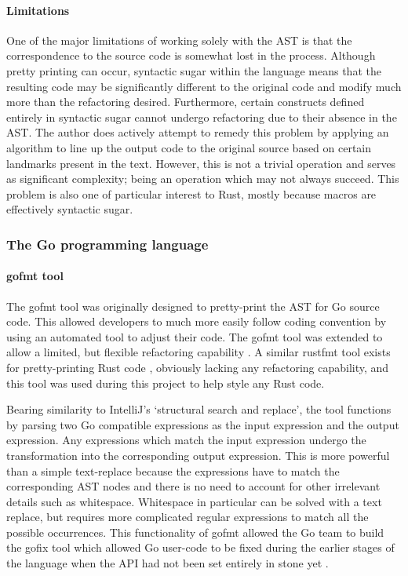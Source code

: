 \paragraph{Limitations}
One of the major limitations of working solely with the AST is that the correspondence to the source code is somewhat lost in the process. Although pretty printing can occur, syntactic sugar within the language means that the resulting code may be significantly different to the original code and modify much more than the refactoring desired. Furthermore, certain constructs defined entirely in syntactic sugar cannot undergo refactoring due to their absence in the AST. The author does actively attempt to remedy this problem by applying an algorithm to line up the output code to the original source based on certain landmarks present in the text. However, this is not a trivial operation and serves as significant complexity; being an operation which may not always succeed. This problem is also one of particular interest to Rust, mostly because macros are effectively syntactic sugar.

\subsubsection{The Go programming language}
\paragraph{gofmt tool}
The gofmt tool was originally designed to pretty-print the AST for Go source code. This allowed developers to much more easily follow coding convention by using an automated tool to adjust their code. The gofmt tool was extended to allow a limited, but flexible refactoring capability \cite{gofmt15}. A similar rustfmt tool exists for pretty-printing Rust code \cite{rfmt}, obviously lacking any refactoring capability, and this tool was used during this project to help style any Rust code.

Bearing similarity to IntelliJ's `structural search and replace', the tool functions by parsing two Go compatible expressions as the input expression and the output expression. Any expressions which match the input expression undergo the transformation into the corresponding output expression. This is more powerful than a simple text-replace because the expressions have to match the corresponding AST nodes and there is no need to account for other irrelevant details such as whitespace. Whitespace in particular can be solved with a text replace, but requires more complicated regular expressions to match all the possible occurrences. This functionality of gofmt allowed the Go team to build the gofix tool which allowed Go user-code to be fixed during the earlier stages of the language when the API had not been set entirely in stone yet \cite{gofix11}.

